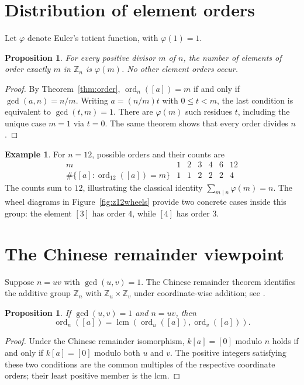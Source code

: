 \documentclass[11pt,a4paper]{article}
\newtheorem{proposition}[theorem]{Proposition}
\theoremstyle{definition}
\newtheorem{example}[theorem]{Example}
\theoremstyle{remark}
\DeclareMathOperator{\ord}{ord}
\DeclareMathOperator{\lcm}{lcm}
\begin{document}
\section{Distribution of element orders}
Let $\varphi$ denote Euler's totient function, with $\varphi(1)=1$.
\begin{proposition}\label{prop:phi}
For every positive divisor $m$ of $n$, the number of elements of order exactly $m$ in $\mathbb Z_n$ is $\varphi(m)$. No other element orders occur.
\end{proposition}
\begin{proof}
By Theorem~\ref{thm:order}, $\ord_n([a])=m$ if and only if $\gcd(a,n)=n/m$. Writing $a=(n/m)t$ with $0\le t<m$, the last condition is equivalent to $\gcd(t,m)=1$. There are $\varphi(m)$ such residues $t$, including the unique case $m=1$ via $t=0$. The same theorem shows that every order divides $n$.
\end{proof}

\begin{example}
For $n=12$, possible orders and their counts are
\[
\begin{array}{c|rrrrrr}
 m&1&2&3&4&6&12\\\hline
 \#\{[a]:\ord_{12}([a])=m\}&1&1&2&2&2&4
\end{array}
\]
The counts sum to $12$, illustrating the classical identity $\sum_{m\mid n}\varphi(m)=n$. The wheel diagrams in Figure~\ref{fig:z12wheels} provide two concrete cases inside this group: the element $[3]$ has order $4$, while $[4]$ has order $3$.
\end{example}

\section{The Chinese remainder viewpoint}
Suppose $n=uv$ with $\gcd(u,v)=1$. The Chinese remainder theorem identifies the additive group $\mathbb Z_n$ with $\mathbb Z_u\times\mathbb Z_v$ under coordinate-wise addition; see \cite{hardy1979introduction}.

\begin{proposition}\label{prop:crt}
If $\gcd(u,v)=1$ and $n=uv$, then
\[
\ord_n([a])=\lcm\!\left(\ord_u([a]),\ord_v([a])\right).
\]
\end{proposition}
\begin{proof}
Under the Chinese remainder isomorphism, $k[a]=[0]$ modulo $n$ holds if and only if $k[a]=[0]$ modulo both $u$ and $v$. The positive integers satisfying these two conditions are the common multiples of the respective coordinate orders; their least positive member is the lcm.
\end{proof}
\end{document}
